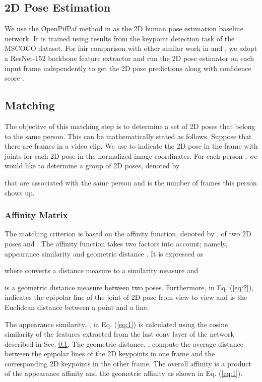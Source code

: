 \documentclass{article}
\begin{document}
\subsection{2D Pose Estimation}\label{subsec:2dpose}

We use the OpenPifPaf method in \cite{kreiss2019pifpaf} as the 2D human
pose estimation baseline network. It is trained using results from the
keypoint detection task of the MSCOCO dataset. For fair comparison with
other similar work in \cite{kolotouros2019learning} and
\cite{kocabas2019vibe}, we adopt a ResNet-152 \cite{he2016identity}
backbone feature extractor and run the 2D pose estimator on each input
frame independently to get the 2D pose predictions  along with
confidence score . 

\subsection{Matching}

The objective of this matching step is to determine a set of 2D poses
that belong to the same person. This can be mathematically stated as
follows. Suppose that there are  frames in a video clip. We use
 to indicate the  2D pose in the
 frame with  joints for each 2D pose in the normalized image
coordinates.  For each person , we would like to determine a group of
2D poses, denoted by
 
that are associated with the same person and  is the number of
frames this person shows up. 

\subsubsection{Affinity Matrix}

The matching criterion is based on the affinity function, denoted by
, of two 2D poses  and . The affinity
function takes two factors into account; namely, appearance 
similarity  and geometric distance . It is expressed as

where  converts a distance measure to 
a similarity measure and

is a geometric distance measure between two poses. Furthermore, in Eq.
(\ref{eq:2}),  indicates the epipolar line of the
 joint of 2D pose  from view  to view  and  is
the Euclidean distance between a point and a line. 

The appearance similarity, , in Eq. (\ref{eq:1}) is
calculated using the cosine similarity of the features extracted from
the last conv layer of the network described in Sec.
\ref{subsec:2dpose}. The geometric distance, , compute the
average distance between the epipolar lines of the 2D keypoints in one
frame and the corresponding 2D keypoints in the other frame. The overall
affinity is a product of the appearance affinity and the geometric
affinity as shown in Eq. (\ref{eq:1}). 
\end{document}

